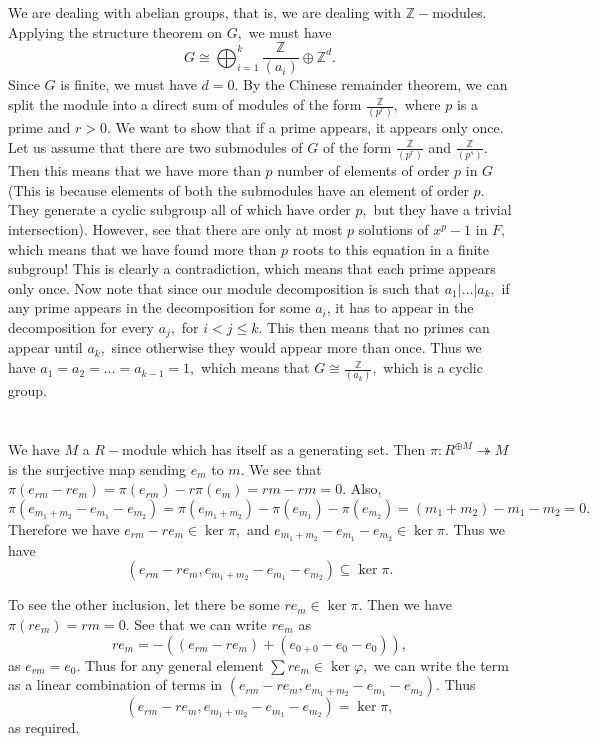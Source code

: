\documentclass{article}
\begin{document}
\section{} %
We are dealing with abelian groups, that is, we are dealing with $\mathbb{Z}-$modules. Applying the structure theorem on $G,$ we must have $$G\cong 
\bigoplus_{i=1}^k \frac{\mathbb{Z}}{(a_i)} \oplus \mathbb{Z}^d.$$ Since $G$ is finite, we must have $d=0.$ By the Chinese remainder theorem, we can split 
the module into a direct sum of modules of the form $\frac{\mathbb{Z}}{(p^r)},$ where $p$ is a prime and $r > 0.$ We want to show that if a prime appears, 
it appears only once. Let us assume that there are two submodules of $G$ of the form $\frac{\mathbb{Z}}{(p^{r})}$ and $\frac{\mathbb{Z}}{(p^{s})}.$ Then 
this means that we have more than $p$ number of elements of order $p$ in $G$ (This is because elements of both the submodules have an element of order $p.$ 
They generate a cyclic subgroup all of which have order $p,$ but they have a trivial intersection). However, see that there are only at most  $p$ solutions 
of $x^p-1$ in $F,$ which means that we have found more than $p$ roots to this equation in a finite subgroup! This is clearly a contradiction, which means 
that each prime appears only once. Now note that since our module decomposition is such that $a_1|\dots|a_k,$ if any prime appears in the decomposition for 
some $a_i$, it has to appear in the decomposition for every $a_j,$ for $i < j \leq k.$ This then means that no primes can appear until $a_k,$ since 
otherwise they would appear more than once. Thus we have $a_1=a_2=\dots =a_{k-1}=1,$ which means that $G \cong \frac{\mathbb{Z}}{(a_k)},$ which is a cyclic 
group. 
\section{} %
We have $M$ a $R-$module which has itself as a generating set. Then $\pi: R^{\oplus M}\twoheadrightarrow M$ is the surjective map sending $e_m$ to $m.$ We 
see that $\pi(e_{rm}-re_m)=\pi(e_{rm})-r\pi(e_m)=rm-rm=0.$ Also, $\pi(e_{m_1+m_2}-e_{m_1}-e_{m_2})=\pi(e_{m_1+m_2})-\pi(e_{m_1})-\pi(e_{m_2})= 
(m_1+m_2)-m_1-m_2=0.$ Therefore we have $ e_{rm}-re_m \in \ker \pi, $ and $e_{m_1+m_2}-e_{m_1}-e_{m_2} \in \ker \pi.$ Thus we have 
$$(e_{rm}-re_m,e_{m_1+m_2}-e_{m_1}-e_{m_2}) \subseteq \ker \pi.$$ 

To see the other inclusion, let there be some $re_m \in \ker \pi.$ Then we have $\pi(re_m)=rm=0.$ See that we can write $re_m$ as $$re_m=-( 
(e_{rm}-re_m)+(e_{0+0}-e_0-e_0) ),$$ as $e_{rm}=e_0.$ Thus for any general element $\sum re_m \in \ker \varphi ,$ we can write the term as a linear 
combination 
of terms in $\left(e_{rm}-re_m, e_{m_1+m_2}-e_{m_1}-e_{m_2}\right).$ Thus $$(e_{rm}-re_m,e_{m_1+m_2}-e_{m_1}-e_{m_2})= \ker \pi, $$ as required. 
\end{document}
